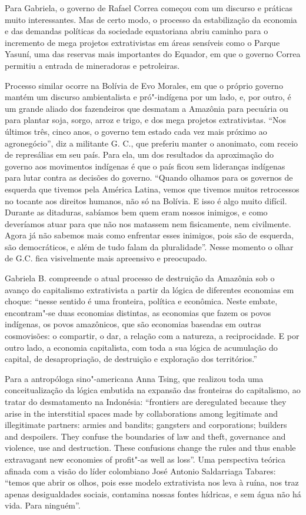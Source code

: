 Para Gabriela, o governo de Rafael Correa começou com um discurso e
práticas muito interessantes. Mas de certo modo, o processo da
estabilização da economia e das demandas políticas da sociedade
equatoriana abriu caminho para o incremento de mega projetos
extrativistas em áreas sensíveis como o Parque Yasuní, uma das reservas
mais importantes do Equador, em que o governo Correa permitiu a entrada
de mineradoras e petroleiras.

Processo similar ocorre na Bolívia de Evo Morales, em que o próprio
governo mantém um discurso ambientalista e pró"-indígena por um lado, e,
por outro, é um grande aliado dos fazendeiros que desmatam a Amazônia
para pecuária ou para plantar soja, sorgo, arroz e trigo, e dos mega
projetos extrativistas. ``Nos últimos três, cinco anos, o governo tem
estado cada vez mais próximo ao agronegócio'', diz a militante G. C.,
que preferiu manter o anonimato, com receio de represálias em seu país.
Para ela, um dos resultados da aproximação do governo aos movimentos
indígenas é que o país ficou sem lideranças indígenas para lutar contra
as decisões do governo. ``Quando olhamos para os governos de esquerda
que tivemos pela América Latina, vemos que tivemos muitos retrocessos no
tocante aos direitos humanos, não só na Bolívia. E isso é algo muito
difícil. Durante as ditaduras, sabíamos bem quem eram nossos inimigos, e
como deveríamos atuar para que não nos matassem nem fisicamente, nem
civilmente. Agora já não sabemos mais como enfrentar esses inimigos,
pois são de esquerda, são democráticos, e além de tudo falam da
pluralidade''. Nesse momento o olhar de G.C. fica visivelmente mais
apreensivo e preocupado.

\asterisc

Gabriela B. compreende o atual processo de destruição da Amazônia sob o
avanço do capitalismo extrativista a partir da lógica de diferentes
economias em choque: ``nesse sentido é uma fronteira, política e
econômica. Neste embate, encontram"-se duas economias distintas, as
economias que fazem os povos indígenas, os povos amazônicos, que são
economias baseadas em outras cosmovisões: o compartir, o dar, a relação
com a natureza, a reciprocidade. E por outro lado, a economia
capitalista, com toda a sua lógica de acumulação do capital, de
desapropriação, de destruição e exploração dos territórios.''

Para a antropóloga sino"-americana Anna Tsing, que realizou toda uma
conceitualização da lógica embutida na expansão das fronteiras do
capitalismo, ao tratar do desmatamento na Indonésia: ``frontiers are
deregulated because they arise in the interstitial spaces made by
collaborations among legitimate and illegitimate partners: armies and
bandits; gangsters and corporations; builders and despoilers. They
confuse the boundaries of law and theft, governance and violence, use
and destruction. These confusions change the rules and thus enable
extravagant new economies of profit"-as well as loss''. Uma perspectiva
teórica afinada com a visão do líder colombiano José Antonio Saldarriaga
Tabares: ``temos que abrir os olhos, pois esse modelo extrativista nos
leva à ruína, nos traz apenas desigualdades sociais, contamina nossas
fontes hídricas, e sem água não há vida. Para ninguém''.

